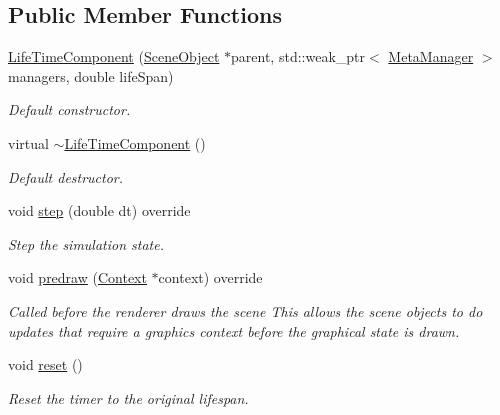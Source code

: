 \subsection*{Public Member Functions}
\begin{DoxyCompactItemize}
\item 
\hyperlink{class_life_time_component_a6021914ebabf59dce79b357790f1dbdb}{Life\+Time\+Component} (\hyperlink{class_scene_object}{Scene\+Object} $\ast$parent, std\+::weak\+\_\+ptr$<$ \hyperlink{class_meta_manager}{Meta\+Manager} $>$ managers, double life\+Span)
\begin{DoxyCompactList}\small\item\em Default constructor. \end{DoxyCompactList}\item 
virtual \hyperlink{class_life_time_component_a186edf6d26d61a244ec0893d3f927c57}{$\sim$\+Life\+Time\+Component} ()
\begin{DoxyCompactList}\small\item\em Default destructor. \end{DoxyCompactList}\item 
void \hyperlink{class_life_time_component_a709b9485f9bce5c7a6cec8f000bcb905}{step} (double dt) override
\begin{DoxyCompactList}\small\item\em Step the simulation state. \end{DoxyCompactList}\item 
void \hyperlink{class_life_time_component_a206515c60de0d9bc07062daf8d24446e}{predraw} (\hyperlink{class_context}{Context} $\ast$context) override
\begin{DoxyCompactList}\small\item\em Called before the renderer draws the scene This allows the scene objects to do updates that require a graphics context before the graphical state is drawn. \end{DoxyCompactList}\item 
void \hyperlink{class_life_time_component_a191771b06f2cf5c2b9bb2495e32c8ecf}{reset} ()
\begin{DoxyCompactList}\small\item\em Reset the timer to the original lifespan. \end{DoxyCompactList}\end{DoxyCompactItemize}
